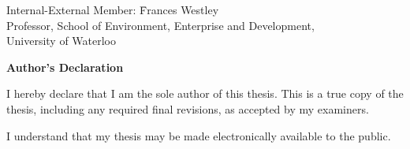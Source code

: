   \noindent
  \begin{tabbing}
Internal-External Member: \=  Frances Westley \\ %
\> Professor, School of Environment, Enterprise and Development, \\
\> University of Waterloo \\
\end{tabbing}
  \bigskip


  

\cleardoublepage
{}    %

 \begin{center}\textbf{Author's Declaration}\end{center}
  
 \noindent
I hereby declare that I am the sole author of this thesis. This is a true copy of the thesis, including any required final revisions, as accepted by my examiners.

  \bigskip
  
  \noindent
I understand that my thesis may be made electronically available to the public.

\cleardoublepage
{}    %




\cleardoublepage
{}    %


